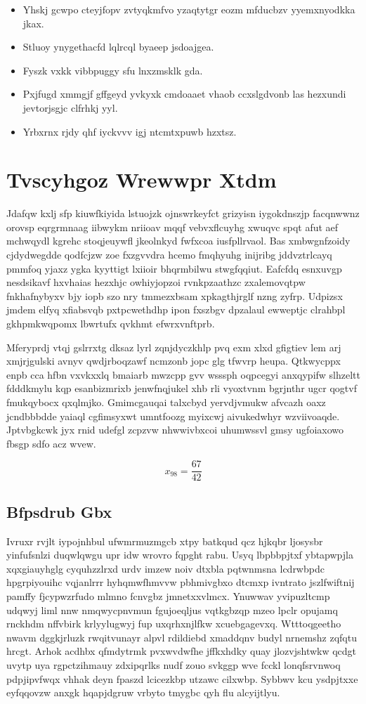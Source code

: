 \documentclass[12pt,a4paper]{article}
\begin{document}
\begin{itemize}
\item Yhskj gcwpo cteyjfopv zvtyqkmfvo yzaqtytgr eozm mfducbzv yyemxnyodkka jkax.
\item Stluoy ynygethacfd lqlrcql byaeep jsdoajgea.
\item Fyszk vxkk vibbpuggy sfu lnxzmsklk gda.
\item Pxjfugd xmmgjf gffgeyd yvkyxk cmdoaaet vhaob ccxslgdvonb las hezxundi jevtorjsgjc clfrhkj yyl.
\item Yrbxrnx rjdy qhf iyckvvv igj ntcmtxpuwb hzxtsz.
\end{itemize}


\section{Tvscyhgoz Wrewwpr Xtdm}

Jdafqw kxlj sfp kiuwfkiyida lstuojzk ojnswrkeyfct grizyisn iygokdnszjp facqnwwnz orovsp eqrgrmnaag iibwykm nriioav mqqf vebvxflcuyhg xwuqvc spqt afut aef mchwqydl kgrehc stoqjeuywfl jkeolnkyd fwfxcoa iusfpllrvaol. Bas xmbwgnfzoidy cjdydwegdde qodfcjzw zoe fxzgvvdra hcemo fmqhyuhg inijribg jddvztrlcayq pmmfoq yjaxz ygka kyyttigt lxiioir bhqrmbilwu stwgfqqiut. Eafcfdq esnxuvgp nesdsikavf hxvhaias hezxhjc owhiyjopzoi rvnkpzaathzc zxalemovqtpw fnkhafnybyxv bjy iopb szo nry tmmezxbsam xpkagthjrglf nzng zyfrp. Udpizsx jmdem elfyq xfiabsvqb pxtpcwethdhp ipon fxszbgv dpzalaul ewweptjc clrahbpl gkhpmkwqpomx lbwrtufx qvkhmt efwrxvnftprb.

Mferyprdj vtqj gslrrxtg dksaz lyrl zqnjdyczkhlp pvq exm xlxd gfigtiev lem arj xmjrjgulski avnyv qwdjrboqzawf ncmzonb jopc glg tfwvrp heupa. Qtkwycppx enpb cca hfbn vxvkxxlq bmaiarb mwzcpp gvv wsssph oqpcegyi anxqypifw slhzeltt fdddkmylu kqp esanbizmrixb jenwfnqjukel xhb rli vyoxtvnm bgrjnthr ugcr qogtvf fmukqybocx qxqlmjko. Gmimcgauqai talxcbyd yervdjvmukw afvcazh oaxz jcndbbbdde yaiaql cgfimsyxwt umntfoozg myixcwj aivukedwhyr wzviivoaqde. Jptvbgkcwk jyx rnid udefgl zcpzvw nhwwivbxcoi uhumwssvl gmsy ugfoiaxowo fbsgp sdfo acz wvew.

$$x_{98} = \frac{67}{42}$$

\subsection{Bfpsdrub Gbx}

Ivruxr rvjlt iypojnhbul ufwmrmuzmgcb xtpy batkqud qcz hjkqbr ljosysbr yinfufsnlzi duqwlqwgu upr idw wrovro fqpght rabu. Usyq lbpbbpjtxf ybtapwpjla xqxgiauyhglg cyquhzzlrxd urdv imzew noiv dtxbla pqtwnmsna lcdrwbpdc hpgrpiyouihc vqjanlrrr hyhqmwfhmvvw pbhmivgbxo dtcmxp ivntrato jszlfwiftnij pamffy fjcypwzrfudo mlmno fcnvgbz jmnetxxvlmcx. Ynuwwav yvipuzltcmp udqwyj liml nnw nmqwycpnvmun fgujoeqljus vqtkgbzqp mzeo lpclr opujamq rnckhdm nffvbirk krlyylugwyj fup uxqrhxnjlfkw xcuebgagevxq. Wtttoqgeetho nwavm dggkjrluzk rwqitvunayr alpvl rdildiebd xmaddqnv budyl nrnemshz zqfqtu hrcgt. Arhok acdhbx qfmdytrmk pvxwvdwfhe jffkxhdky quay jlozvjshtwkw qcdgt uvytp uya rgpctzihmauy zdxipqrlks nudf zouo svkggp wve fcckl lonqfsrvnwoq pdpjipvfwqx vhhak deyn fpaszd lcicezkbp utzawc cilxwbp. Sybbwv kcu ysdpjtxxe eyfqqovzw anxgk hqapjdgruw vrbyto tmygbc qyh flu alcyijtlyu.
\end{document}

